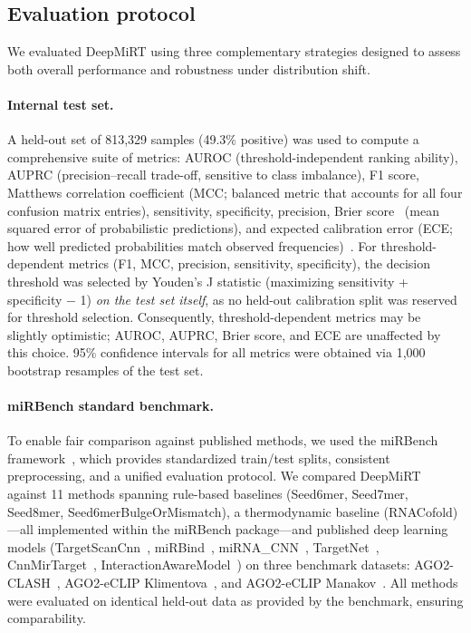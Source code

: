 \documentclass[10pt,a4paper]{article}
\begin{document}
\subsection{Evaluation protocol}

We evaluated DeepMiRT using three complementary strategies designed to assess both overall performance and robustness under distribution shift.

\paragraph{Internal test set.} A held-out set of 813{,}329 samples (49.3\% positive) was used to compute a comprehensive suite of metrics: AUROC (threshold-independent ranking ability), AUPRC (precision--recall trade-off, sensitive to class imbalance), F1 score, Matthews correlation coefficient (MCC; balanced metric that accounts for all four confusion matrix entries), sensitivity, specificity, precision, Brier score~\citep{brier1950verification} (mean squared error of probabilistic predictions), and expected calibration error (ECE; how well predicted probabilities match observed frequencies)~\citep{naeini2015ece}. For threshold-dependent metrics (F1, MCC, precision, sensitivity, specificity), the decision threshold was selected by Youden's J statistic (maximizing sensitivity + specificity $-$ 1) \textit{on the test set itself}, as no held-out calibration split was reserved for threshold selection. Consequently, threshold-dependent metrics may be slightly optimistic; AUROC, AUPRC, Brier score, and ECE are unaffected by this choice. 95\% confidence intervals for all metrics were obtained via 1{,}000 bootstrap resamples of the test set.

\paragraph{miRBench standard benchmark.} To enable fair comparison against published methods, we used the miRBench framework~\citep{sammut2025mirbench}, which provides standardized train/test splits, consistent preprocessing, and a unified evaluation protocol. We compared DeepMiRT against 11 methods spanning rule-based baselines (Seed6mer, Seed7mer, Seed8mer, Seed6merBulgeOrMismatch), a thermodynamic baseline (RNACofold)---all implemented within the miRBench package---and published deep learning models (TargetScanCnn~\citep{mcgeary2019targetscan}, miRBind~\citep{klimentova2022mirbind}, miRNA\_CNN~\citep{hejret2023chimeric}, TargetNet~\citep{min2022targetnet}, CnnMirTarget~\citep{zheng2020cnnmirtarget}, InteractionAwareModel~\citep{yang2024interaction}) on three benchmark datasets: AGO2-CLASH~\citep{hejret2023chimeric}, AGO2-eCLIP Klimentova~\citep{klimentova2022mirbind}, and AGO2-eCLIP Manakov~\citep{manakov2022eclip}. All methods were evaluated on identical held-out data as provided by the benchmark, ensuring comparability.
\end{document}
